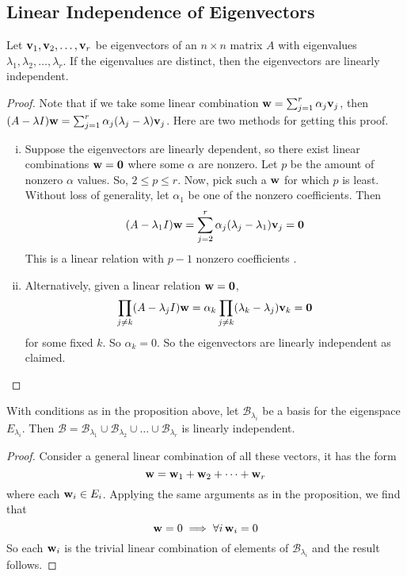 \subsection{Linear Independence of Eigenvectors}
\begin{proposition}
	Let \(\vb v_1, \vb v_2, \dots, \vb v_r\) be eigenvectors of an \(n\times n\) matrix \(A\) with eigenvalues \(\lambda_1, \lambda_2,\dots,\lambda_r\).
	If the eigenvalues are distinct, then the eigenvectors are linearly independent.
\end{proposition}
\begin{proof}
	Note that if we take some linear combination \(\vb w = \sum_{j=1}^r \alpha_j\vb v_j\), then \((A - \lambda I)\vb w = \sum_{j=1}^r \alpha_j(\lambda_j - \lambda)\vb v_j\).
	Here are two methods for getting this proof.
	\begin{enumerate}[(i)]
		\item Suppose the eigenvectors are linearly dependent, so there exist linear combinations \(\vb w = \vb 0\) where some \(\alpha\) are nonzero.
		      Let \(p\) be the amount of nonzero \(\alpha\) values.
		      So, \(2 \leq p \leq r\).
		      Now, pick such a \(\vb w\) for which \(p\) is least.
		      Without loss of generality, let \(\alpha_1\) be one of the nonzero coefficients.
		      Then
		      \[
			      (A - \lambda_1 I)\vb w = \sum_{j=2}^r \alpha_j(\lambda_j - \lambda_1)\vb v_j = \vb 0
		      \]
		      This is a linear relation with \(p-1\) nonzero coefficients \contradiction.
		\item Alternatively, given a linear relation \(\vb w=\vb 0\),
		      \[
			      \prod_{j \neq k} (A - \lambda_j I) \vb w = \alpha_k \prod_{j \neq k} (\lambda_k - \lambda_j) \vb v_k = \vb 0
		      \]
		      for some fixed \(k\).
		      So \(\alpha_k = 0\).
		      So the eigenvectors are linearly independent as claimed.
	\end{enumerate}
\end{proof}
\begin{corollary}
	With conditions as in the proposition above, let \(\mathcal B_{\lambda_i}\) be a basis for the eigenspace \(E_{\lambda_i}\).
	Then \(\mathcal B = \mathcal B_{\lambda_1} \cup \mathcal B_{\lambda_2} \cup \dots \cup \mathcal B_{\lambda_r}\) is linearly independent.
\end{corollary}
\begin{proof}
	Consider a general linear combination of all these vectors, it has the form
	\[
		\vb w = \vb w_1 + \vb w_2 + \dots + \vb w_r
	\]
	where each \(\vb w_i \in E_i\).
	Applying the same arguments as in the proposition, we find that
	\[
		\vb w = 0 \implies \forall i\,\vb w_i = 0
	\]
	So each \(\vb w_i\) is the trivial linear combination of elements of \(\mathcal B_{\lambda_i}\) and the result follows.
\end{proof}


